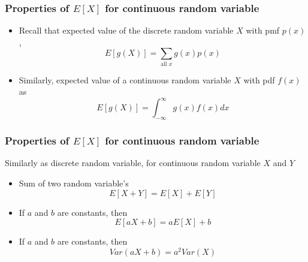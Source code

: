 \documentclass[slidestop,compress,mathserif]{beamer}
\begin{document}
\begin{frame}\frametitle{Properties of $E[X]$ for continuous random variable}

\begin{itemize}
\item Recall that expected value of the discrete random variable $X$ with pmf $p(x)$,
\[E[g(X)] = \sum_{\text{all } x} g(x) p(x)\]


\item Similarly, expected value of a continuous random variable $X$ with pdf $f(x)$ as
\[E[g(X)] = \int_{-\infty}^{\infty} g(x) f(x) dx\]

%
\end{itemize}


\end{frame}





\begin{frame}\frametitle{Properties of $E[X]$ for continuous random variable}
Similarly as discrete random variable, for continuous random variable $X$ and $Y$

\begin{itemize}

\item Sum of two random variable's \[ E[X+Y] = E[X]+E[Y] \]


\item If $a$ and $b$ are constants, then
\[ E[aX+b] = a E[X] + b \]

\item If $a$ and $b$ are constants, then
\[ Var(aX+b) = a^2 Var(X) \]

\end{itemize}

\end{frame}
\end{document}
